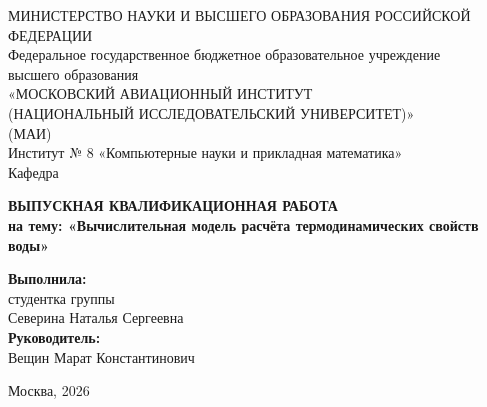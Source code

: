 \begin{titlepage}
\begin{center}
    МИНИСТЕРСТВО НАУКИ И ВЫСШЕГО ОБРАЗОВАНИЯ РОССИЙСКОЙ ФЕДЕРАЦИИ\\[5mm]
    Федеральное государственное бюджетное образовательное учреждение\\
    высшего образования\\
    «МОСКОВСКИЙ АВИАЦИОННЫЙ ИНСТИТУТ\\
    (НАЦИОНАЛЬНЫЙ ИССЛЕДОВАТЕЛЬСКИЙ УНИВЕРСИТЕТ)»\\
    (МАИ)\\[10mm]
    Институт № 8 «Компьютерные науки и прикладная математика»\\[2mm]
    Кафедра \underline{\hspace{9cm}}\\

    \vspace{2cm}

    {\LARGE \bfseries ВЫПУСКНАЯ КВАЛИФИКАЦИОННАЯ РАБОТА\\[2mm]}
    {\Large \bfseries на тему: «Вычислительная модель расчёта термодинамических свойств воды»\\[5mm]}

    \vspace{1.5cm}

    \begin{flushright}
        \textbf{Выполнила:}\\
        студентка группы \underline{\hspace{4cm}}\\
        Северина Наталья Сергеевна\\[5mm]
        \textbf{Руководитель:}\\
        Вещин Марат Константинович\\[5mm]
    \end{flushright}

    \vfill

    Москва, 2026
\end{center}
\end{titlepage}

